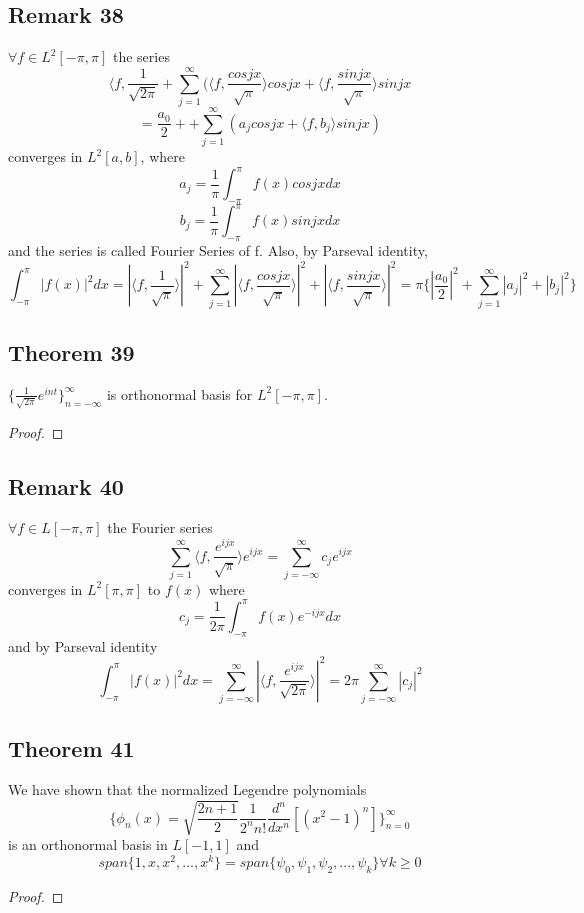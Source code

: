 \documentclass{article}
\begin{document}
\subsection*{Remark 38}
$\forall f\in L^2[-\pi,\pi]$ the series 
\[
\langle f,\frac{1}{\sqrt{2\pi}}+\sum_{j=1}^{\infty} (\langle f, \frac{cos jx}{\sqrt{\pi}} \rangle cos jx+\langle f, \frac{sin jx}{\sqrt{\pi}} \rangle sin jx
\]
\[
=\frac{a_0}{2}++\sum_{j=1}^{\infty} (a_j cos jx+\langle f, b_j \rangle sin jx)
\]
converges in $L^2[a,b]$, where
\[
a_j=\frac{1}{\pi}\int_{-\pi}^{\pi}f(x) cos jx dx
\]
\[
b_j=\frac{1}{\pi}\int_{-\pi}^{\pi}f(x) sin jx dx
\]
and the series is called Fourier Series of f. Also, by Parseval identity,
\[
\int_{-\pi}^{\pi}|f(x)|^2dx = |\langle f,\frac{1}{\sqrt{\pi}}\rangle|^2+\sum_{j=1}^{\infty}|\langle f,\frac{cos jx}{\sqrt{\pi}}\rangle|^2+|\langle f,\frac{sin jx}{\sqrt{\pi}}\rangle|^2=\pi \{|\frac{a_0}{2}|^2+\sum_{j=1}^{\infty}|a_j|^2+|b_j|^2\}
\]

\subsection*{Theorem 39}
$\{\frac{1}{\sqrt{2\pi}}e^{int}\}_{n=-\infty}^{\infty}$ is orthonormal basis for $L^2[-\pi, \pi]$.

\begin{proof}
\end{proof}

\subsection *{Remark 40}
$\forall f\in L[-\pi,\pi]$ the Fourier series
\[
\sum_{j=1}^{\infty} \langle f, \frac{e^{ijx}}{\sqrt{\pi}} \rangle e^{ijx}=\sum_{j=-\infty}^{\infty} c_j e^{ijx}
\]
converges in $L^2[\pi, \pi]$ to $f(x)$ where 
\[
c_j=\frac{1}{2\pi}\int_{-\pi}^{\pi}f(x) e^{-ijx} dx
\]
and by Parseval identity
\[
\int_{-\pi}^{\pi}|f(x)|^2dx =\sum_{j=-\infty}^{\infty}|\langle f,\frac{e^{ijx}}{\sqrt{2\pi}}\rangle|^2=2\pi \sum_{j=-\infty}^{\infty}|c_j|^2
\]


\subsection *{Theorem 41}
We have shown that the normalized Legendre polynomials
\[
\{\phi_n(x)=\sqrt{\frac{2n+1}{2}}\frac{1}{2^n n!}\frac{d^n}{dx^n}[(x^2-1)^n]\}_{n=0}^{\infty}
\]
is an orthonormal basis in $L[-1,1]$ and 
\[
span\{1,x,x^2,...,x^k\}=span\{\psi_0,\psi_1,\psi_2,...,\psi_k\} \forall k\geq 0
\]
\begin{proof}
\end{proof}
\end{document}
